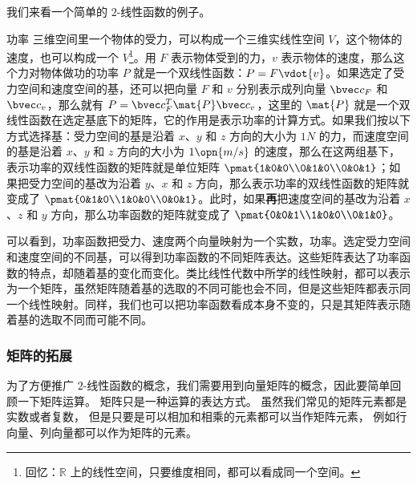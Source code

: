 我们来看一个简单的 $2$-线性函数的例子。

\begin{example}{功率}
三维空间里一个物体的受力，可以构成一个三维实线性空间 $V$，这个物体的速度，也可以构成一个 $V$\footnote{回忆：$\mathbb{R}$ 上的线性空间，只要维度相同，都可以看成同一个空间。}。用 ${F}$ 表示物体受到的力，${v}$ 表示物体的速度，那么这个力对物体做功的功率 $P$ 就是一个双线性函数：$P={F}\vdot{v}$。如果选定了受力空间和速度空间的基，还可以把向量 ${F}$ 和 ${v}$ 分别表示成列向量 $\bvec c_F$ 和 $\bvec c_v$，那么就有 $P=\bvec c^T_F\mat {P}\bvec c_v$，这里的 $\mat{P}$ 就是一个双线性函数在选定基底下的矩阵，它的作用是表示功率的计算方式。如果我们按以下方式选择基：受力空间的基是沿着 $x$、$y$ 和 $z$ 方向的大小为 $1N$ 的力，而速度空间的基是沿着 $x$、$y$ 和 $z$ 方向的大小为 $1\opn{m/s}$ 的速度，那么在这两组基下，表示功率的双线性函数的矩阵就是单位矩阵 $\pmat{1&0&0\\0&1&0\\0&0&1}$；如果把受力空间的基改为沿着 $y$、$x$ 和 $z$ 方向，那么表示功率的双线性函数的矩阵就变成了 $\pmat{0&1&0\\1&0&0\\0&0&1}$。此时，如果\textbf{再}把速度空间的基改为沿着 $x$、$z$ 和 $y$ 方向，那么功率函数的矩阵就变成了 $\pmat{0&0&1\\1&0&0\\0&1&0}$。
\end{example}

可以看到，功率函数把受力、速度两个向量映射为一个实数，功率。选定受力空间和速度空间的不同基，可以得到功率函数的不同矩阵表达。这些矩阵表达了功率函数的特点，却随着基的变化而变化。类比线性代数中所学的线性映射，都可以表示为一个矩阵，虽然矩阵随着基的选取的不同可能也会不同，但是这些矩阵都表示同一个线性映射。同样，我们也可以把功率函数看成本身不变的，只是其矩阵表示随着基的选取不同而可能不同。

\subsubsection{矩阵的拓展}

为了方便推广 $2$-线性函数的概念，我们需要用到向量矩阵的概念，因此要简单回顾一下矩阵运算。 矩阵只是一种运算的表达方式。 虽然我们常见的矩阵元素都是实数或者复数， 但是只要是可以相加和相乘的元素都可以当作矩阵元素， 例如行向量、列向量都可以作为矩阵的元素。

